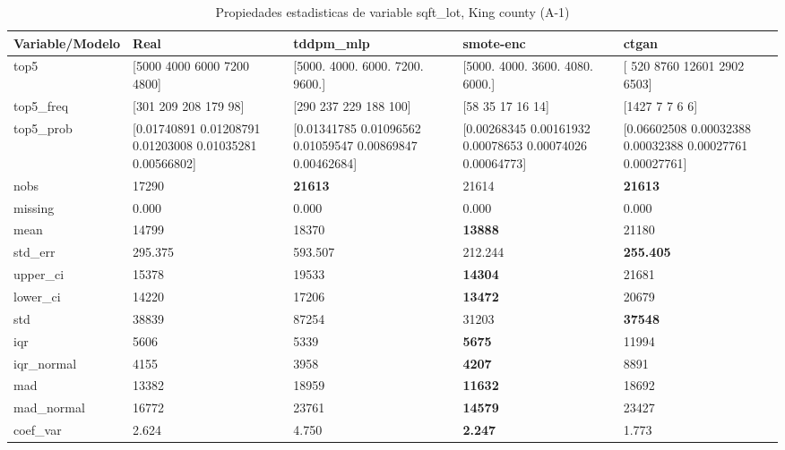 \begin{table}[H]
\centering
\fontsize{8}{14}\selectfont
\caption{Propiedades  estadisticas de variable sqft\_lot, King county (A-1)}
\label{table-stats-king county-a-1-sqft_lot}
\begin{tabular}{|l|m{10em}|m{10em}|m{10em}|m{10em}|}
\hline
 \rowcolor[gray]{0.8}
Variable/Modelo & Real & tddpm\_mlp & smote-enc & ctgan \\
\hline top5 & [5000 4000 6000 7200 4800] & [5000. 4000. 6000. 7200. 9600.] & [5000. 4000. 3600. 4080. 6000.] & [  520  8760 12601  2902  6503] \\
\hline top5\_freq & [301 209 208 179  98] & [290 237 229 188 100] & [58 35 17 16 14] & [1427    7    7    6    6] \\
\hline top5\_prob & [0.01740891 0.01208791 0.01203008 0.01035281 0.00566802] & [0.01341785 0.01096562 0.01059547 0.00869847 0.00462684] & [0.00268345 0.00161932 0.00078653 0.00074026 0.00064773] & [0.06602508 0.00032388 0.00032388 0.00027761 0.00027761] \\
\hline nobs & 17290 & \bfseries 21613 & \cellcolor[rgb]{0.9, 0.54, 0.52} 21614 & \bfseries 21613 \\
\hline missing & 0.000 & 0.000 & 0.000 & 0.000 \\
\hline mean & 14799 & 18370 & \bfseries 13888 & \cellcolor[rgb]{0.9, 0.54, 0.52} 21180 \\
\hline std\_err & 295.375 & \cellcolor[rgb]{0.9, 0.54, 0.52} 593.507 & 212.244 & \bfseries 255.405 \\
\hline upper\_ci & 15378 & 19533 & \bfseries 14304 & \cellcolor[rgb]{0.9, 0.54, 0.52} 21681 \\
\hline lower\_ci & 14220 & 17206 & \bfseries 13472 & \cellcolor[rgb]{0.9, 0.54, 0.52} 20679 \\
\hline std & 38839 & \cellcolor[rgb]{0.9, 0.54, 0.52} 87254 & 31203 & \bfseries 37548 \\
\hline iqr & 5606 & 5339 & \bfseries 5675 & \cellcolor[rgb]{0.9, 0.54, 0.52} 11994 \\
\hline iqr\_normal & 4155 & 3958 & \bfseries 4207 & \cellcolor[rgb]{0.9, 0.54, 0.52} 8891 \\
\hline mad & 13382 & \cellcolor[rgb]{0.9, 0.54, 0.52} 18959 & \bfseries 11632 & 18692 \\
\hline mad\_normal & 16772 & \cellcolor[rgb]{0.9, 0.54, 0.52} 23761 & \bfseries 14579 & 23427 \\
\hline coef\_var & 2.624 & \cellcolor[rgb]{0.9, 0.54, 0.52} 4.750 & \bfseries 2.247 & 1.773 \\

\end{tabular}
\end{table}
